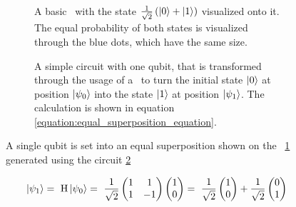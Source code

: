 \begin{figure}[!h]
    \begin{subfigure}{.5\textwidth}
        \centering
        \scalebox{\blochwidth}{
            
        }
        \caption{A basic \qsphere\ with the state $\frac{1}{\sqrt{2}}\left(\ket{0} + \ket{1}\right)$ visualized onto it. The equal probability of both states is visualized through the blue dots, which have the same size.}
        \label{figure:state_h_q_sphere}
    \end{subfigure}
    \begin{subfigure}{.5\textwidth}
        \centering{}
        \caption{A simple circuit with one qubit, that is transformed
    through the usage of a \hgate\ to turn the initial state $\ket{0}$ at position $\ket{\psi_0}$ into the state $\ket{1}$ at position $\ket{\psi_1}$. The calculation is shown in equation \ref{equation:equal_superposition_equation}.}
        \label{figure:h_circuit}
    \end{subfigure}
    \caption{A single qubit is set into an equal superposition shown on the \qsphere\ \ref{figure:state_h_q_sphere} generated using the circuit \ref{figure:h_circuit}}
    \label{figure:_one_qubit_h_state_circuit_qsphere}
\end{figure}



\begin{equation}
    \centering
    \begin{split}
        \ket{\psi_1} =\ \mathrm{H}\ket{\psi_0} =\ \frac{1}{\sqrt{2}}\begin{pmatrix} 1 & 1 \\ 1 & -1 \end{pmatrix}\begin{pmatrix}1 \\ 0\end{pmatrix} =\ \frac{1}{\sqrt{2}}\begin{pmatrix}1 \\ 0 \end{pmatrix} + \frac{1}{\sqrt{2}}\begin{pmatrix}0 \\ 1 \end{pmatrix}\\
    \end{split}
    \label{equation:equal_superposition_equation}
\end{equation}



